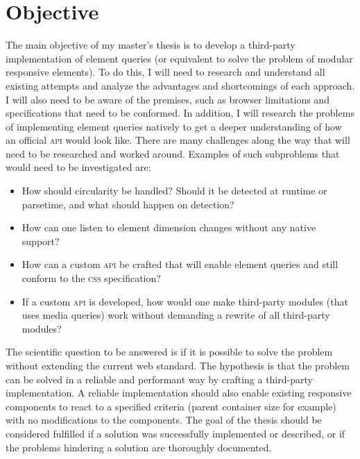 \documentclass[oneside,a4paper,11pt]{kth-mag}
\begin{document}
\section{Objective}
The main objective of my master's thesis is to develop a third-party implementation of element queries (or equivalent to solve the problem of modular responsive elements). To do this, I will need to research and understand all existing attempts and analyze the advantages and shortcomings of each approach. I will also need to be aware of the premises, such as browser limitations and specifications that need to be conformed. In addition, I will research the problems of implementing element queries natively to get a deeper understanding of how an official \textsc{api} would look like. There are many challenges along the way that will need to be researched and worked around. Examples of such subproblems that would need to be investigated are:
\begin{itemize}
\item How should circularity be handled? Should it be detected at runtime or parsetime, and what should happen on detection?
\item How can one listen to element dimension changes without any native support?
\item How can a custom \textsc{api} be crafted that will enable element queries and still conform to the \textsc{css} specification?
\item If a custom \textsc{api} is developed, how would one make third-party modules (that uses media queries) work without demanding a rewrite of all third-party modules?
\end{itemize}
The scientific question to be answered is if it is possible to solve the problem  without extending the current web standard. The hypothesis is that the problem can be solved in a reliable and performant way by crafting a third-party implementation. A reliable implementation should also enable existing responsive components to react to a specified criteria (parent container size for example) with no modifications to the components. The goal of the thesis should be considered fulfilled if a solution was successfully implemented or described, or if the problems hindering a solution are thoroughly documented.
\end{document}
